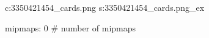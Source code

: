 c:3350421454\textures\hexer_cards.png
s:3350421454\textures\hexer_cards.png_ex

mipmaps: 0  # number of mipmaps
